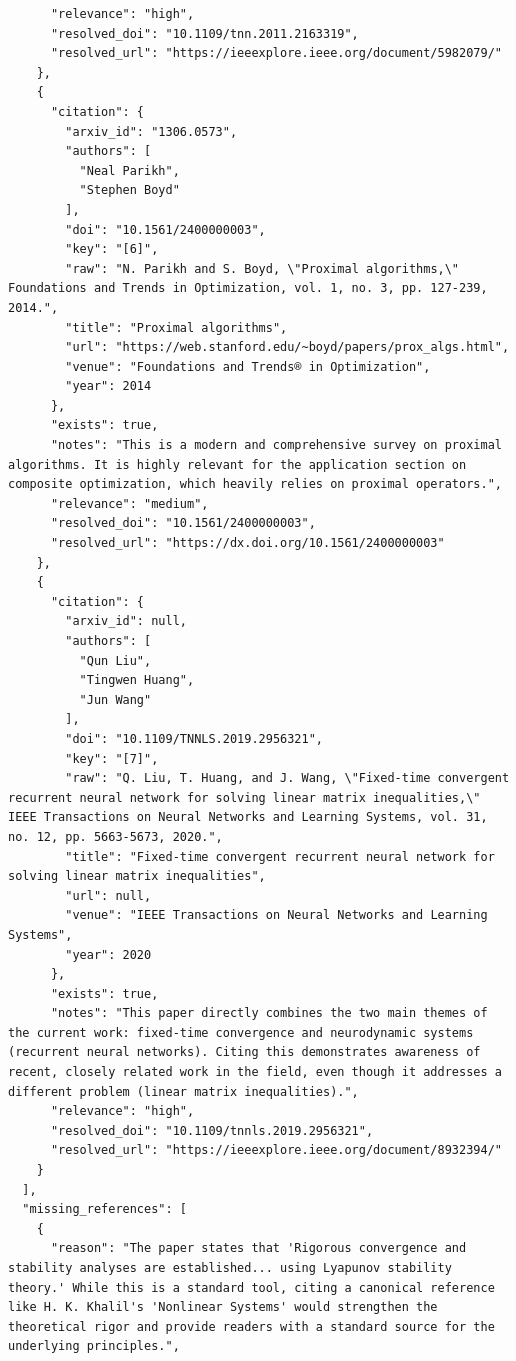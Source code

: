 \documentclass[11pt]{article}
\begin{document}
\begin{verbatim}
      "relevance": "high",
      "resolved_doi": "10.1109/tnn.2011.2163319",
      "resolved_url": "https://ieeexplore.ieee.org/document/5982079/"
    },
    {
      "citation": {
        "arxiv_id": "1306.0573",
        "authors": [
          "Neal Parikh",
          "Stephen Boyd"
        ],
        "doi": "10.1561/2400000003",
        "key": "[6]",
        "raw": "N. Parikh and S. Boyd, \"Proximal algorithms,\" Foundations and Trends in Optimization, vol. 1, no. 3, pp. 127-239, 2014.",
        "title": "Proximal algorithms",
        "url": "https://web.stanford.edu/~boyd/papers/prox_algs.html",
        "venue": "Foundations and Trends® in Optimization",
        "year": 2014
      },
      "exists": true,
      "notes": "This is a modern and comprehensive survey on proximal algorithms. It is highly relevant for the application section on composite optimization, which heavily relies on proximal operators.",
      "relevance": "medium",
      "resolved_doi": "10.1561/2400000003",
      "resolved_url": "https://dx.doi.org/10.1561/2400000003"
    },
    {
      "citation": {
        "arxiv_id": null,
        "authors": [
          "Qun Liu",
          "Tingwen Huang",
          "Jun Wang"
        ],
        "doi": "10.1109/TNNLS.2019.2956321",
        "key": "[7]",
        "raw": "Q. Liu, T. Huang, and J. Wang, \"Fixed-time convergent recurrent neural network for solving linear matrix inequalities,\" IEEE Transactions on Neural Networks and Learning Systems, vol. 31, no. 12, pp. 5663-5673, 2020.",
        "title": "Fixed-time convergent recurrent neural network for solving linear matrix inequalities",
        "url": null,
        "venue": "IEEE Transactions on Neural Networks and Learning Systems",
        "year": 2020
      },
      "exists": true,
      "notes": "This paper directly combines the two main themes of the current work: fixed-time convergence and neurodynamic systems (recurrent neural networks). Citing this demonstrates awareness of recent, closely related work in the field, even though it addresses a different problem (linear matrix inequalities).",
      "relevance": "high",
      "resolved_doi": "10.1109/tnnls.2019.2956321",
      "resolved_url": "https://ieeexplore.ieee.org/document/8932394/"
    }
  ],
  "missing_references": [
    {
      "reason": "The paper states that 'Rigorous convergence and stability analyses are established... using Lyapunov stability theory.' While this is a standard tool, citing a canonical reference like H. K. Khalil's 'Nonlinear Systems' would strengthen the theoretical rigor and provide readers with a standard source for the underlying principles.",

\end{verbatim}
\end{document}
